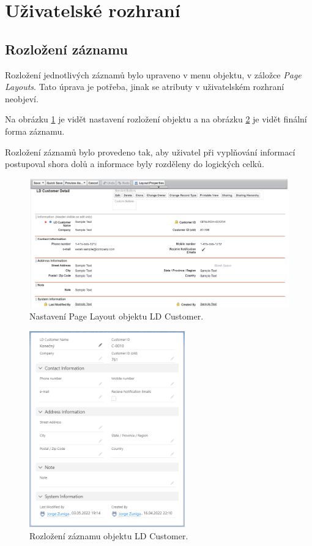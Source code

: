\section{Uživatelské rozhraní}
\subsection{Rozložení záznamu}
Rozložení jednotlivých záznamů bylo upraveno v menu objektu, v záložce \emph{Page Layouts}. Tato úprava je potřeba, jinak se atributy v uživatelském rozhraní neobjeví. 

Na obrázku \ref{fig:LD_Customer_Page_Layout} je vidět nastavení rozložení objektu a na obrázku \ref{fig:LD_Customer_Record_Layout} je vidět finální forma záznamu.

Rozložení záznamů bylo provedeno tak, aby uživatel při vyplňování informací postupoval shora dolů a informace byly rozděleny do logických celků.
\begin{figure}[h!]
    \centering
    \includegraphics[width=\textwidth]{assets/7_implementace/uživatelské_rozhraní/LD Customer Page Layout.png}
    \caption{Nastavení Page Layout objektu LD Customer.}
    \label{fig:LD_Customer_Page_Layout}
\end{figure}
\begin{figure}[h!]
    \centering
    \includegraphics[width=0.6\textwidth]{assets/7_implementace/uživatelské_rozhraní/LD Customer Record Layout.png}
    \caption{Rozložení záznamu objektu LD Customer.}
    \label{fig:LD_Customer_Record_Layout}
\end{figure}
\FloatBarrier
